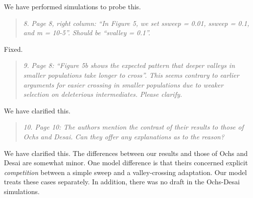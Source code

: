 \documentclass[11pt]{article}
\newenvironment{reviewerquote}{\begin{quote}\color{black}\itshape}{\end{quote}}
\begin{document}
We have performed simulations to probe this.

\begin{reviewerquote}
8. Page 8, right column: “In Figure 5, we set ssweep = 0.01, ssweep = 0.1, and m = 10-5”. Should be “svalley = 0.1”.
\end{reviewerquote}

Fixed.

\begin{reviewerquote}
9. Page 8: “Figure 5b shows the expected pattern that deeper valleys in smaller populations take longer to cross”. This seems contrary to earlier arguments for easier crossing in smaller populations due to weaker selection on deleterious intermediates. Please clarify.
\end{reviewerquote}

We have clarified this.

\begin{reviewerquote}
10. Page 10: The authors mention the contrast of their results to those of Ochs and Desai. Can they offer any explanations as to the reason?
\end{reviewerquote}

We have clarified this. The differences between our results and those of Ochs and Desai are somewhat minor. One model difference is that theirs concerned explicit \emph{competition} between a simple sweep and a valley-crossing adaptation. Our model treats these cases separately. In addition, there was no draft in the Ochs-Desai simulations.
\end{document}
